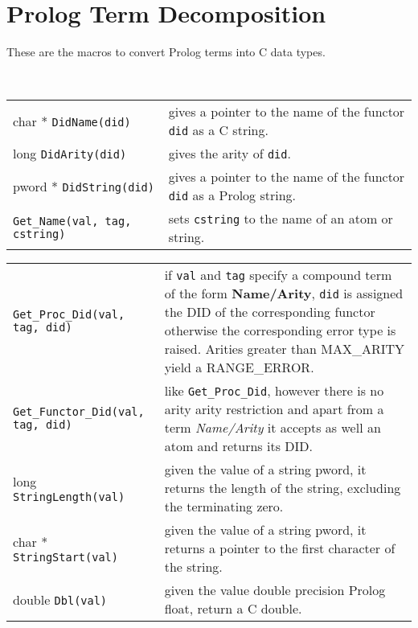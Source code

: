 
\section{Prolog Term Decomposition}
These are the macros to convert Prolog terms into C data types.

\noindent
 \\
\begin{tabular}{|p{7.7cm}p{7.5cm}|}
\hline
char * {\tt DidName(did)} &
gives a pointer to the name of the functor {\tt did} as a C string.\\

long {\tt DidArity(did)} & gives the arity of {\tt did}. \\

pword * {\tt DidString(did)} &
gives a pointer to the name of the functor {\tt did} as a Prolog string.\\

{\tt Get_Name(val, tag, cstring)} &
sets {\tt cstring} to the name of an atom or string. \\
\hline
\end{tabular}

\noindent
\begin{tabular}{|p{7.7cm}p{7.5cm}|}
\hline
{\tt Get_Proc_Did(val, tag, did)} & 
if {\tt val} and {\tt tag} specify a compound term of the form
{\bf Name/Arity}, {\tt did} is assigned the DID of the
corresponding functor otherwise the corresponding
error type is raised. Arities greater than MAX_ARITY
yield a RANGE_ERROR.\\

{\tt Get_Functor_Did(val, tag, did)} & 
like {\tt Get_Proc_Did}, however there is no arity
arity restriction and apart from a term {\it Name/Arity}
it accepts as well an atom and returns its DID.\\

long {\tt StringLength(val)} & given the value of a string pword, it returns the
length of the string, excluding the terminating zero.\\

char * {\tt StringStart(val)} & given the value of a string pword, it returns a
pointer to the first character of the string.\\

double {\tt Dbl(val)} & given the value double
precision Prolog float, return a C double.\\
\hline
\end{tabular}

